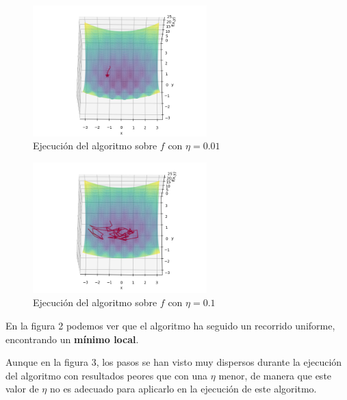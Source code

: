 \documentclass{article}
\begin{document}
    \pagebreak

    \begin{figure}
        \caption{Ejecución del algoritmo sobre $f$ con $\eta = 0.01$}
        \centering
        \includegraphics[width=0.6\textwidth]{Figure_2.png}
    \end{figure}
    \begin{figure}[h]
        \caption{Ejecución del algoritmo sobre $f$ con $\eta = 0.1$}
        \centering
        \includegraphics[width=0.6\textwidth]{Figure_3.png}
    \end{figure}
    En la figura 2 podemos ver que el algoritmo ha seguido un recorrido uniforme, encontrando un \textbf{mínimo local}. \par
    Aunque en la figura 3, los pasos se han visto muy dispersos durante la ejecución del algoritmo con resultados peores que
    con una $\eta$ menor, de manera que este valor de $\eta$ no es adecuado para aplicarlo en la ejecución de este algoritmo. \par

    \pagebreak
\end{document}
